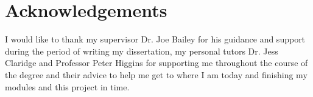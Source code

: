 \documentclass[12pt, a4paper,oneside]{book}
\numberwithin{equation}{section}
\begin{document}
\section*{Acknowledgements}
I would like to thank my supervisor Dr. Joe Bailey for his guidance and support during the period of writing my dissertation, my personal tutors Dr. Jess Claridge and Professor Peter Higgins for supporting me throughout the course of the degree and their advice to help me get to where I am today and finishing my modules and this project in time.
\end{document}
